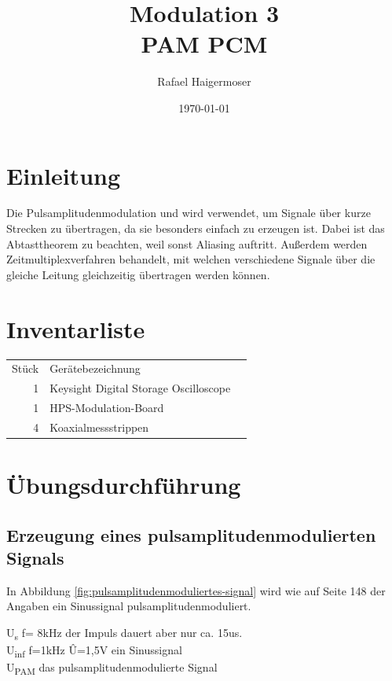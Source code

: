 \documentclass[12pt,a4paper]{scrartcl}
\title{Modulation 3 \\PAM PCM}
\date{\today{}}
\author{Rafael Haigermoser}
\begin{document}
    \maketitle
    \newpage
    \tableofcontents
    \newpage
   
    \section{Einleitung}
    \label{sec:einleitung}
        Die Pulsamplitudenmodulation und wird verwendet, um Signale über kurze Strecken zu übertragen, da sie besonders einfach zu erzeugen ist. Dabei ist das Abtasttheorem zu beachten, weil sonst Aliasing auftritt. Außerdem werden Zeitmultiplexverfahren behandelt, mit welchen verschiedene Signale über die gleiche Leitung gleichzeitig übertragen werden können.
    \section{Inventarliste}
    \label{sec:inventarliste}
    \begin{tabular}{rlr}
      Stück & Gerätebezeichnung \\
             1 & Keysight Digital Storage Oscilloscope  \\
             1 & HPS-Modulation-Board       \\
             4 & Koaxialmessstrippen \\
    \end{tabular}
    
    
    \section{Übungsdurchführung}
    \label{sec-übungsdurchfürung}
        \subsection{Erzeugung eines pulsamplitudenmodulierten Signals}
        \label{sub-sec-pulsamplitudenmoduliertes-signal}
        In Abbildung \ref{fig:pulsamplitudenmoduliertes-signal} wird wie auf Seite 148 der Angaben ein Sinussignal pulsamplitudenmoduliert.
       
U\textsubscript{s}  f= 8kHz der Impuls dauert aber nur ca. 15us. \\
        U\textsubscript{inf} f=1kHz \^{U}=1,5V ein Sinussignal\\
        U\textsubscript{PAM} das pulsamplitudenmodulierte Signal
        
\end{document}
